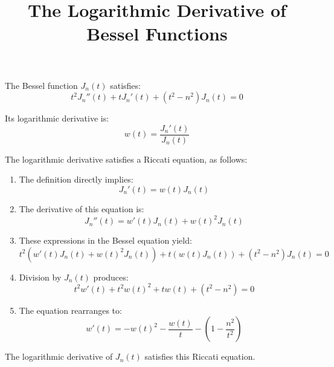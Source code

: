 \documentclass{article}
\title{The Logarithmic Derivative of Bessel Functions}
\author{}
\date{}
\begin{document}
\maketitle

The Bessel function $J_n(t)$ satisfies:
\[
t^2J_n''(t) + tJ_n'(t) + (t^2 - n^2)J_n(t) = 0
\]

Its logarithmic derivative is:
\[
w(t) = \frac{J_n'(t)}{J_n(t)}
\]

The logarithmic derivative satisfies a Riccati equation, as follows:

\begin{enumerate}
\item The definition directly implies:
    \[J_n'(t) = w(t)J_n(t)\]

\item The derivative of this equation is:
    \[J_n''(t) = w'(t)J_n(t) + w(t)^2J_n(t)\]

\item These expressions in the Bessel equation yield:
    \[t^2(w'(t)J_n(t) + w(t)^2J_n(t)) + t(w(t)J_n(t)) + (t^2 - n^2)J_n(t) = 0\]

\item Division by $J_n(t)$ produces:
    \[t^2w'(t) + t^2w(t)^2 + tw(t) + (t^2 - n^2) = 0\]

\item The equation rearranges to:
    \[w'(t) = -w(t)^2 - \frac{w(t)}{t} - (1 - \frac{n^2}{t^2})\]
\end{enumerate}

The logarithmic derivative of $J_n(t)$ satisfies this Riccati equation.
\end{document}
